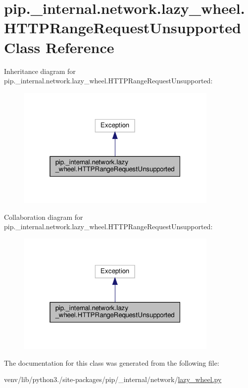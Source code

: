 \hypertarget{classpip_1_1__internal_1_1network_1_1lazy__wheel_1_1HTTPRangeRequestUnsupported}{}\section{pip.\+\_\+internal.\+network.\+lazy\+\_\+wheel.\+H\+T\+T\+P\+Range\+Request\+Unsupported Class Reference}
\label{classpip_1_1__internal_1_1network_1_1lazy__wheel_1_1HTTPRangeRequestUnsupported}


Inheritance diagram for pip.\+\_\+internal.\+network.\+lazy\+\_\+wheel.\+H\+T\+T\+P\+Range\+Request\+Unsupported\+:
\nopagebreak
\begin{figure}[H]
\begin{center}
\leavevmode
\includegraphics[width=277pt]{classpip_1_1__internal_1_1network_1_1lazy__wheel_1_1HTTPRangeRequestUnsupported__inherit__graph}
\end{center}
\end{figure}


Collaboration diagram for pip.\+\_\+internal.\+network.\+lazy\+\_\+wheel.\+H\+T\+T\+P\+Range\+Request\+Unsupported\+:
\nopagebreak
\begin{figure}[H]
\begin{center}
\leavevmode
\includegraphics[width=277pt]{classpip_1_1__internal_1_1network_1_1lazy__wheel_1_1HTTPRangeRequestUnsupported__coll__graph}
\end{center}
\end{figure}


The documentation for this class was generated from the following file\+:\begin{DoxyCompactItemize}
\item 
venv/lib/python3./site-\/packages/pip/\+\_\+internal/network/\hyperlink{lazy__wheel_8py}{lazy\+\_\+wheel.\+py}\end{DoxyCompactItemize}
